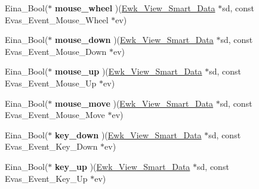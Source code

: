 \begin{DoxyCompactItemize}
\item 
\hypertarget{struct__Ewk__View__Smart__Class_ad3ff9882b155e554822ef7d41fd54bd6}{Eina\+\_\+\+Bool($\ast$ {\bfseries mouse\+\_\+wheel} )(\hyperlink{ewk__view_8h_a9a4bd081861301f6c55cb5da384dfc7d}{Ewk\+\_\+\+View\+\_\+\+Smart\+\_\+\+Data} $\ast$sd, const Evas\+\_\+\+Event\+\_\+\+Mouse\+\_\+\+Wheel $\ast$ev)}\label{struct__Ewk__View__Smart__Class_ad3ff9882b155e554822ef7d41fd54bd6}

\item 
\hypertarget{struct__Ewk__View__Smart__Class_a05336fc04153b9e8a609928aaeb0b515}{Eina\+\_\+\+Bool($\ast$ {\bfseries mouse\+\_\+down} )(\hyperlink{ewk__view_8h_a9a4bd081861301f6c55cb5da384dfc7d}{Ewk\+\_\+\+View\+\_\+\+Smart\+\_\+\+Data} $\ast$sd, const Evas\+\_\+\+Event\+\_\+\+Mouse\+\_\+\+Down $\ast$ev)}\label{struct__Ewk__View__Smart__Class_a05336fc04153b9e8a609928aaeb0b515}

\item 
\hypertarget{struct__Ewk__View__Smart__Class_aeef9e651ea9bb763a0bc9e9df3863e7b}{Eina\+\_\+\+Bool($\ast$ {\bfseries mouse\+\_\+up} )(\hyperlink{ewk__view_8h_a9a4bd081861301f6c55cb5da384dfc7d}{Ewk\+\_\+\+View\+\_\+\+Smart\+\_\+\+Data} $\ast$sd, const Evas\+\_\+\+Event\+\_\+\+Mouse\+\_\+\+Up $\ast$ev)}\label{struct__Ewk__View__Smart__Class_aeef9e651ea9bb763a0bc9e9df3863e7b}

\item 
\hypertarget{struct__Ewk__View__Smart__Class_aedc8be51f4152a339a2333e05cd74685}{Eina\+\_\+\+Bool($\ast$ {\bfseries mouse\+\_\+move} )(\hyperlink{ewk__view_8h_a9a4bd081861301f6c55cb5da384dfc7d}{Ewk\+\_\+\+View\+\_\+\+Smart\+\_\+\+Data} $\ast$sd, const Evas\+\_\+\+Event\+\_\+\+Mouse\+\_\+\+Move $\ast$ev)}\label{struct__Ewk__View__Smart__Class_aedc8be51f4152a339a2333e05cd74685}

\item 
\hypertarget{struct__Ewk__View__Smart__Class_a4c53e20041a4b18a2f1fb96d482e9219}{Eina\+\_\+\+Bool($\ast$ {\bfseries key\+\_\+down} )(\hyperlink{ewk__view_8h_a9a4bd081861301f6c55cb5da384dfc7d}{Ewk\+\_\+\+View\+\_\+\+Smart\+\_\+\+Data} $\ast$sd, const Evas\+\_\+\+Event\+\_\+\+Key\+\_\+\+Down $\ast$ev)}\label{struct__Ewk__View__Smart__Class_a4c53e20041a4b18a2f1fb96d482e9219}

\item 
\hypertarget{struct__Ewk__View__Smart__Class_ab6264f5b371f29330a33a3c876f70126}{Eina\+\_\+\+Bool($\ast$ {\bfseries key\+\_\+up} )(\hyperlink{ewk__view_8h_a9a4bd081861301f6c55cb5da384dfc7d}{Ewk\+\_\+\+View\+\_\+\+Smart\+\_\+\+Data} $\ast$sd, const Evas\+\_\+\+Event\+\_\+\+Key\+\_\+\+Up $\ast$ev)}\label{struct__Ewk__View__Smart__Class_ab6264f5b371f29330a33a3c876f70126}


\end{DoxyCompactItemize}
